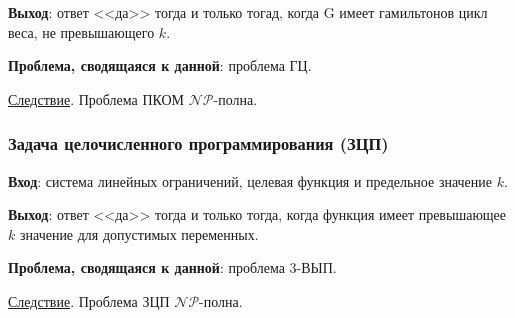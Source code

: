 \textbf{Выход}: ответ <<да>> тогда и только  тогад, когда G имеет гамильтонов цикл веса, не превышающего $k$.

\textbf{Проблема, сводящаяся к данной}: проблема ГЦ.

\underline{Следствие}. Проблема ПКОМ $\mathscr{NP}$-полна.

\subsubsection{Задача целочисленного программирования (ЗЦП)}
\textbf{Вход}: система линейных ограничений, целевая функция и предельное значение $k$.

\textbf{Выход}: ответ <<да>> тогда и только тогда, когда функция имеет превышающее $k$ значение для допустимых переменных.

\textbf{Проблема, сводящаяся к данной}: проблема 3-ВЫП.

\underline{Следствие}. Проблема ЗЦП $\mathscr{NP}$-полна.